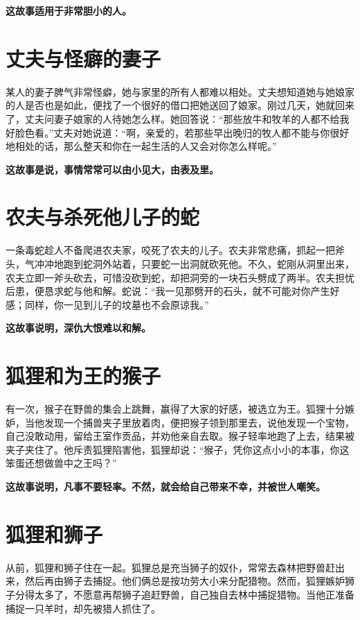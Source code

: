 {\bfseries \color{red}这故事适用于非常胆小的人。}

\section{丈夫与怪癖的妻子}

某人的妻子脾气非常怪癖，她与家里的所有人都难以相处。丈夫想知道她与她娘家的人是否也是如此，便找了一个很好的借口把她送回了娘家。刚过几天，她就回来了，丈夫问妻子娘家的人待她怎么样。她回答说：“那些放牛和牧羊的人都不给我好脸色看。”丈夫对她说道：“啊，亲爱的，若那些早出晚归的牧人都不能与你很好地相处的话，那么整天和你在一起生活的人又会对你怎么样呢。”

{\bfseries \color{red}这故事是说，事情常常可以由小见大，由表及里。}

\section{农夫与杀死他儿子的蛇}

一条毒蛇趁人不备爬进农夫家，咬死了农夫的儿子。农夫非常悲痛，抓起一把斧头，气冲冲地跑到蛇洞外站着，只要蛇一出洞就砍死他。不久，蛇刚从洞里出来，农夫立即一斧头砍去，可惜没砍到蛇，却把洞旁的一块石头劈成了两半。农夫担忧后患，便恳求蛇与他和解。蛇说：“我一见那劈开的石头，就不可能对你产生好感；同样，你一见到儿子的坟墓也不会原谅我。”

{\bfseries \color{red}这故事说明，深仇大恨难以和解。}

\section{狐狸和为王的猴子}

有一次，猴子在野兽的集会上跳舞，赢得了大家的好感，被选立为王。狐狸十分嫉妒，当他发现一个捕兽夹子里放着肉，便把猴子领到那里去，说他发现一个宝物，自己没敢动用，留给王室作贡品，并劝他亲自去取。猴子轻率地跑了上去，结果被夹子夹住了。他斥责狐狸陷害他，狐狸却说：“猴子，凭你这点小小的本事，你这笨蛋还想做兽中之王吗？”

{\bfseries \color{red}这故事说明，凡事不要轻率。不然，就会给自己带来不幸，并被世人嘲笑。}

\section{狐狸和狮子}

从前，狐狸和狮子住在一起。狐狸总是充当狮子的奴仆，常常去森林把野兽赶出来，然后再由狮子去捕捉。他们俩总是按功劳大小来分配猎物。然而，狐狸嫉妒狮子分得太多了，不愿意再帮狮子追赶野兽，自己独自去林中捕捉猎物。当他正准备捕捉一只羊时，却先被猎人抓住了。

